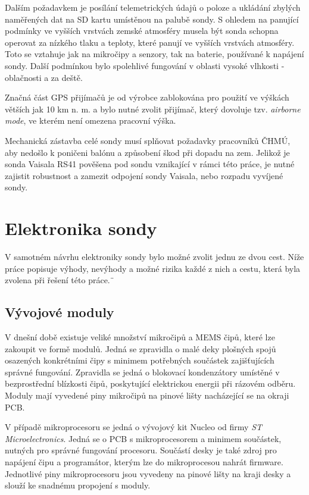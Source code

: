 \documentclass[twoside]{ctuthesis}
\theoremstyle{plain}
\theoremstyle{definition}
\theoremstyle{note}
\begin{document}
	Dalším požadavkem je posílání telemetrických údajů o poloze a ukládání zbylých naměřených dat na SD kartu umístěnou na palubě sondy. S ohledem na panující podmínky ve vyšších vrstvách zemské atmosféry musela být sonda schopna operovat za nízkého tlaku a teploty, které panují ve vyšších vrstvách atmosféry. Toto se vztahuje jak na mikročipy a senzory, tak na baterie, používané k napájení sondy. Další podmínkou bylo spolehlivé fungování v oblasti vysoké vlhkosti - oblačnosti a za deště. 

	Značná část GPS přijímačů je od výrobce zablokována pro použití ve výškách větších jak 10 km n. m. a bylo nutné zvolit přijímač, který dovoluje tzv. \textit{airborne mode}, ve kterém není omezena pracovní výška.

	Mechanická zástavba celé sondy musí splňovat požadavky pracovníků ČHMÚ, aby nedošlo k poničeni balónu a způsobení škod při dopadu na zem. Jelikož je sonda Vaisala RS41 pověšena pod sondu vznikající v rámci této práce, je nutné zajistit robustnost a zamezit odpojení sondy Vaisala, nebo rozpadu vyvíjené sondy.


	
	\section{Elektronika sondy}
	V samotném návrhu elektroniky sondy bylo možné zvolit jednu ze dvou cest. Níže práce popisuje výhody, nevýhody a možné rizika každé z nich a cestu, která byla zvolena při řešení této práce.¨
		\subsection{Vývojové moduly}
		V dnešní době existuje veliké množství mikročipů a MEMS čipů, které lze zakoupit ve formě modulů. Jedná se zpravidla o malé deky plošných spojů osazených konkrétními čipy s minimem potřebných součástek zajišťujících správné fungování. Zpravidla se jedná o blokovací kondenzátory umístěné v bezprostřední blízkosti čipů, poskytující elektrickou energii při rázovém odběru. Moduly mají vyvedené piny mikročipů na pinové lišty nacházející se na okraji PCB. 
		
		V případě mikroprocesoru se jedná o vývojový kit Nucleo od firmy \textit{ST Microelectronics}. Jedná se o PCB s mikroprocesorem a minimem součástek, nutných pro správné fungování procesoru. Součástí desky je také zdroj pro napájení čipu a programátor, kterým lze do mikroprocesou nahrát firmware. Jednotlivé piny mikroprocesoru jsou vyvedeny na pinové lišty na kraji desky a slouží ke snadnému propojení s moduly. 
		
\end{document}

